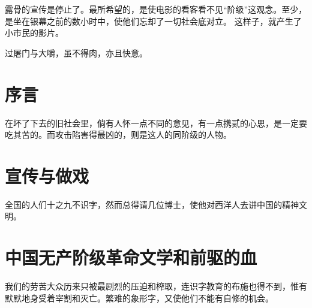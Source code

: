 \documentclass[a4paper]{article}
\begin{document}
\begin{sloppy}
        露骨的宣传是停止了。最所希望的，是使电影的看客看不见“阶级”这观念。至少，是坐在银幕之前的数小时中，使他们忘却了一切社会底对立。
        这样子，就产生了小市民的影片。

        过屠门与大嚼，虽不得肉，亦且快意。

        \section{
            序言
        }
        在坏了下去的旧社会里，倘有人怀一点不同的意见，有一点携贰的心思，是一定要吃其苦的。而攻击陷害得最凶的，则是这人的同阶级的人物。

        \section{
            宣传与做戏
        }
        全国的人们十之九不识字，然而总得请几位博士，使他对西洋人去讲中国的精神文明。

        \section{
            中国无产阶级革命文学和前驱的血
        }
        我们的劳苦大众历来只被最剧烈的压迫和榨取，连识字教育的布施也得不到，惟有默默地身受着宰割和灭亡。繁难的象形字，又使他们不能有自修的机会。

    \end{sloppy}
\end{document}
